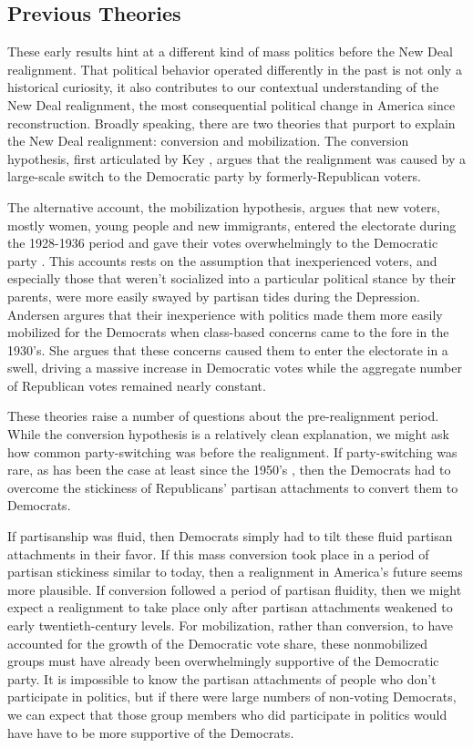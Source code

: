 \documentclass[11pt]{scrartcl}\usepackage[]{graphicx}\usepackage[]{color}
\begin{document}
\subsection*{Previous Theories}

These early results hint at a different kind of mass politics before the New Deal realignment. That political behavior operated differently in the past is not only a historical curiosity, it also contributes to our contextual understanding of the New Deal realignment, the most consequential political change in America since reconstruction. Broadly speaking, there are two theories that purport to explain the New Deal realignment: conversion and mobilization. The conversion hypothesis, first articulated by Key \citeyearpar{key1955theory}, argues that the realignment was caused by a large-scale switch to the Democratic party by formerly-Republican voters.  

The alternative account, the mobilization hypothesis, argues that new voters,  mostly women, young people and new immigrants, entered the electorate during the 1928-1936 period and gave their votes overwhelmingly to the Democratic party \citep{andersen1979creation}.  This accounts rests on the assumption that inexperienced voters, and especially those that weren't socialized into a particular political stance by their parents, were more easily swayed by  partisan tides during the Depression. Andersen argures that their inexperience with politics made them more easily mobilized for the Democrats when class-based concerns came to the fore in the 1930's. She argues that these concerns caused them to enter the electorate in a swell, driving a massive increase in Democratic votes while the aggregate number of Republican votes remained nearly constant.  

These theories raise a number of questions about the pre-realignment period.  While the conversion hypothesis is a relatively clean explanation, we might ask how common party-switching was before the realignment.  If party-switching was rare, as has been the case at least since the 1950's \citep{campbell1960american}, then the Democrats had to overcome the stickiness of Republicans' partisan attachments to convert them to Democrats. 

% 

If partisanship was fluid, then Democrats simply had to tilt these fluid partisan attachments in their favor.  If this mass conversion took place in a period of partisan stickiness similar to today, then a realignment in America's future seems more plausible. If conversion followed a period of partisan fluidity, then we might expect a realignment to take place only after partisan attachments weakened to early twentieth-century levels. For mobilization, rather than conversion, to have accounted for the growth of the Democratic vote share, these nonmobilized groups must have already been overwhelmingly supportive of the Democratic party. It is impossible to know the partisan attachments of people who don't participate in politics, but if there were large numbers of non-voting Democrats, we can expect that those group members who did participate in politics would have have to be more supportive of the Democrats.
\end{document}
